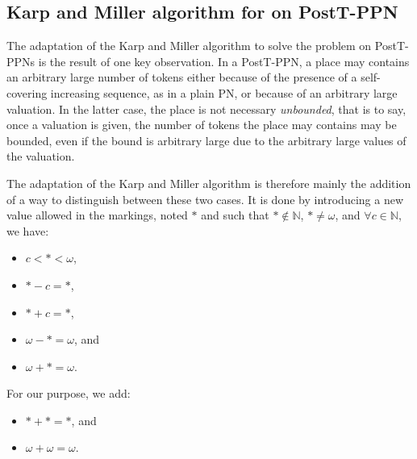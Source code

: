 \subsection{Karp and Miller algorithm for \Ecov on PostT-\ac{PPN}}

The adaptation of the Karp and Miller algorithm to solve the \Ecov problem on PostT-\acp{PPN} is the result of one key observation.
In a PostT-\ac{PPN}, a place may contains an arbitrary large number of tokens either because of the presence of a self-covering increasing sequence, as in a plain \ac{PN}, or because of an arbitrary large valuation.
In the latter case, the place is not necessary \emph{unbounded}, that is to say, once a valuation is given, the number of tokens the place may contains may be bounded, even if the bound is arbitrary large due to the arbitrary large values of the valuation.

The adaptation of the Karp and Miller algorithm is therefore mainly the addition of a way to distinguish between these two cases.
It is done by introducing a new value allowed in the markings, noted $*$ and such that $* \notin \mathbb{N}$, $* \neq \omega$, and $\forall c \in \mathbb{N}$, we have:
\begin{itemize}
  \item $c < * < \omega$,
  \item $* - c = *$,
  \item $* + c = *$,
  \item $\omega - * = \omega$, and
  \item $\omega + * = \omega$.
\end{itemize}

For our purpose, we add: 
\begin{itemize}
  \item $* + * = *$, and
  \item $\omega + \omega = \omega$.
\end{itemize}


